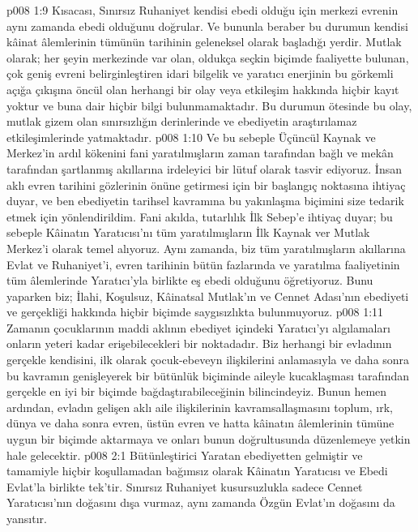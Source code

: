 \vs p008 1:9 Kısacası, Sınırsız Ruhaniyet kendisi ebedi olduğu için merkezi evrenin aynı zamanda ebedi olduğunu doğrular. Ve bununla beraber bu durumun kendisi kâinat âlemlerinin tümünün tarihinin geleneksel olarak başladığı yerdir. Mutlak olarak; her şeyin merkezinde var olan, oldukça seçkin biçimde faaliyette bulunan, çok geniş evreni belirginleştiren idari bilgelik ve yaratıcı enerjinin bu görkemli açığa çıkışına öncül olan herhangi bir olay veya etkileşim hakkında hiçbir kayıt yoktur ve buna dair hiçbir bilgi bulunmamaktadır. Bu durumun ötesinde bu olay, mutlak gizem olan sınırsızlığın derinlerinde ve ebediyetin araştırılamaz etkileşimlerinde yatmaktadır.
\vs p008 1:10 Ve bu sebeple Üçüncül Kaynak ve Merkez’in ardıl kökenini fani yaratılmışların zaman tarafından bağlı ve mekân tarafından şartlanmış akıllarına irdeleyici bir lütuf olarak tasvir ediyoruz. İnsan aklı evren tarihini gözlerinin önüne getirmesi için bir başlangıç noktasına ihtiyaç duyar, ve ben ebediyetin tarihsel kavramına bu yakınlaşma biçimini size tedarik etmek için yönlendirildim. Fani akılda, tutarlılık İlk Sebep’e ihtiyaç duyar; bu sebeple Kâinatın Yaratıcısı’nı tüm yaratılmışların İlk Kaynak ver Mutlak Merkez’i olarak temel alıyoruz. Aynı zamanda, biz tüm yaratılmışların akıllarına Evlat ve Ruhaniyet’i, evren tarihinin bütün fazlarında ve yaratılma faaliyetinin tüm âlemlerinde Yaratıcı’yla birlikte eş ebedi olduğunu öğretiyoruz. Bunu yaparken biz; İlahi, Koşulsuz, Kâinatsal Mutlak’ın ve Cennet Adası’nın ebediyeti ve gerçekliği hakkında hiçbir biçimde saygısızlıkta bulunmuyoruz.
\vs p008 1:11 Zamanın çocuklarının maddi aklının ebediyet içindeki Yaratıcı’yı algılamaları onların yeteri kadar erişebilecekleri bir noktadadır. Biz herhangi bir evladının gerçekle kendisini, ilk olarak çocuk\hyp{}ebeveyn ilişkilerini anlamasıyla ve daha sonra bu kavramın genişleyerek bir bütünlük biçiminde aileyle kucaklaşması tarafından gerçekle en iyi bir biçimde bağdaştırabileceğinin bilincindeyiz. Bunun hemen ardından, evladın gelişen aklı aile ilişkilerinin kavramsallaşmasını toplum, ırk, dünya ve daha sonra evren, üstün evren ve hatta kâinatın âlemlerinin tümüne uygun bir biçimde aktarmaya ve onları bunun doğrultusunda düzenlemeye yetkin hale gelecektir.
\vs p008 2:1 Bütünleştirici Yaratan ebediyetten gelmiştir ve tamamiyle hiçbir koşullamadan bağımsız olarak Kâinatın Yaratıcısı ve Ebedi Evlat’la birlikte tek’tir. Sınırsız Ruhaniyet kusursuzlukla sadece Cennet Yaratıcısı’nın doğasını dışa vurmaz, aynı zamanda Özgün Evlat’ın doğasını da yansıtır.
